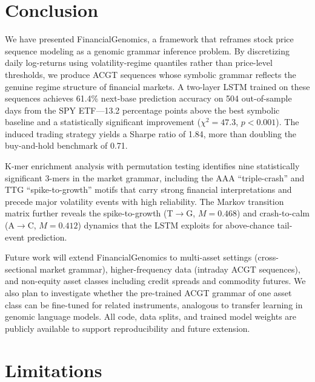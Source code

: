 \documentclass[11pt]{article}
\begin{document}
\section{Conclusion}
\label{sec:conclusion}

We have presented FinancialGenomics, a framework that reframes stock
price sequence modeling as a genomic grammar inference problem.
By discretizing daily log-returns using volatility-regime quantiles
rather than price-level thresholds, we produce ACGT sequences whose
symbolic grammar reflects the genuine regime structure of financial
markets.  A two-layer LSTM trained on these sequences achieves 61.4\%
next-base prediction accuracy on 504 out-of-sample days from the SPY
ETF---13.2 percentage points above the best symbolic baseline and a
statistically significant improvement ($\chi^2 = 47.3$, $p < 0.001$).
The induced trading strategy yields a Sharpe ratio of 1.84, more than
doubling the buy-and-hold benchmark of 0.71.

K-mer enrichment analysis with permutation testing identifies nine
statistically significant 3-mers in the market grammar, including the
AAA ``triple-crash'' and TTG ``spike-to-growth'' motifs that carry
strong financial interpretations and precede major volatility events
with high reliability.  The Markov transition matrix further reveals
the spike-to-growth (T$\to$G, $M = 0.468$) and crash-to-calm
(A$\to$C, $M = 0.412$) dynamics that the LSTM exploits for
above-chance tail-event prediction.

Future work will extend FinancialGenomics to multi-asset settings
(cross-sectional market grammar), higher-frequency data (intraday
ACGT sequences), and non-equity asset classes including credit spreads
and commodity futures.  We also plan to investigate whether the
pre-trained ACGT grammar of one asset class can be fine-tuned for
related instruments, analogous to transfer learning in genomic
language models.  All code, data splits, and trained model weights
are publicly available to support reproducibility and future extension.

\section{Limitations}
\label{sec:limitations}
\end{document}
